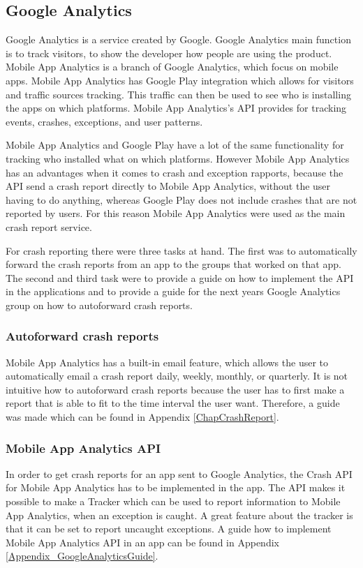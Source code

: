 \subsection{Google Analytics}\label{Sprint1_SubsecGoogleAnalytics}
Google Analytics is a service created by Google. Google Analytics main function is to track visitors, to show the developer how people are using the product. Mobile App Analytics is a branch of Google Analytics, which focus on mobile apps. Mobile App Analytics has Google Play integration which allows for visitors and traffic sources tracking. This traffic can then be used to see who is installing the apps on which platforms. Mobile App Analytics's API provides for tracking events, crashes, exceptions, and user patterns. \citep{GoogleAnalyticsWhat}

Mobile App Analytics and Google Play have a lot of the same functionality for tracking who installed what on which platforms. However Mobile App Analytics has an advantages when it comes to crash and exception rapports, because the API send a crash report directly to Mobile App Analytics, without the user having to do anything, whereas Google Play does not include crashes that are not reported by users. For this reason Mobile App Analytics were used as the main crash report service.

For crash reporting there were three tasks at hand. The first was to automatically forward the crash reports from an app to the groups that worked on that app. The second and third task were to provide a guide on how to implement the API in the applications and to provide a guide for the next years Google Analytics group on how to autoforward crash reports. 

\subsubsection{Autoforward crash reports}
Mobile App Analytics has a built-in email feature, which allows the user to automatically email a crash report daily, weekly, monthly, or quarterly. It is not intuitive how to autoforward crash reports because the user has to first make a report that is able to fit to the time interval the user want. Therefore, a guide was made which can be found in Appendix \ref{ChapCrashReport}.

\subsubsection{Mobile App Analytics API}
In order to get crash reports for an app sent to Google Analytics, the Crash API for Mobile App Analytics has to be implemented in the app. The API makes it possible to make a Tracker which can be used to report information to Mobile App Analytics, when an exception is caught. A great feature about the tracker is that it can be set to report uncaught exceptions. A guide how to implement Mobile App Analytics API in an app can be found in Appendix \ref{Appendix_GoogleAnalyticsGuide}.